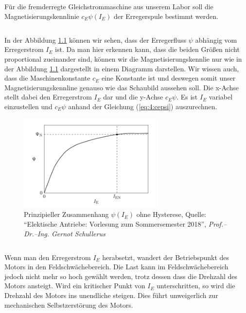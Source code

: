 \chapter{}
Für die fremderregte Gleichstrommaschine aus unserem Labor soll die Magnetisierungskennlinie $ c_{E}\psi(I_{E}) $ der Erregerspule bestimmt werden.
\section{}
In der Abbildung \ref{fig:5:skript} können wir sehen, dass der Erregerfluss $ \psi $ abhängig vom Erregerstrom $ I_{E} $ ist. Da man hier erkennen kann, dass die beiden Größen nicht proportional zueinander sind, können wir die Magnetisierungskennlie nur wie in der Abbildung \ref{fig:5:skript} dargestellt in einem Diagramm darstellen. Wir wissen auch, dass die Maschinenkonstante $ c_{E} $ eine Konstante ist und deswegen somit unser Magnetisierungskennline genauso wie das Schaubild aussehen soll. Die x-Achse stellt dabei den Erregerstrom $ I_{E} $ dar und die y-Achse $ c_{E}\psi $. Es ist $ I_{E} $ variabel einzustellen und $ c_{E}\psi $ anhand der Gleichung (\ref{eq:4:cepsi}) auszurechnen.

\begin{figure}[h]
	\centering
	\includegraphics[width=0.65\textwidth]{./bilder/aufgabe5_skript.pdf}
	\caption{Prinzipieller Zusammenhang $ \psi(I_{E}) $ ohne Hysterese, Quelle: \textquotedblleft Elektische Antriebe: Vorlesung zum Sommersemester 2018\textquotedblright, \textit{Prof.–Dr.–Ing. Gernot Schullerus}}
	\label{fig:5:skript}
\end{figure}


\section{}
Wenn man den Erregerstrom $ I_{E} $ herabsetzt, wandert der Betriebspunkt des Motors in den Feldschwächebereich. Die Last kann im Feldschwächebereich jedoch nicht mehr so hoch gewählt werden, trotz dessen dass die Drehzahl des Motors ansteigt. Wird ein kritischer Punkt von $ I_{E} $ unterschritten, so wird die Drehzahl des Motors ins unendliche steigen. Dies führt unweigerlich zur mechanischen Selbstzerstörung des Motors.


